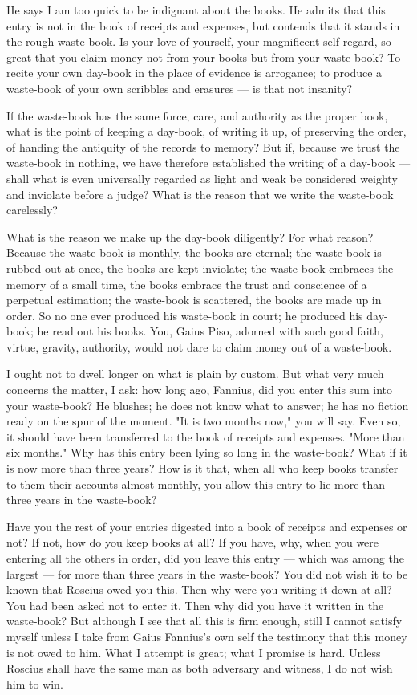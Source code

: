  He says I am too quick to be indignant about the books. He admits that this entry is not in the book of receipts and expenses, but contends that it stands in the rough waste-book. Is your love of yourself, your magnificent self-regard, so great that you claim money not from your books but from your waste-book? To recite your own day-book in the place of evidence is arrogance; to produce a waste-book of your own scribbles and erasures --- is that not insanity?

 If the waste-book has the same force, care, and authority as the proper book, what is the point of keeping a day-book, of writing it up, of preserving the order, of handing the antiquity of the records to memory? But if, because we trust the waste-book in nothing, we have therefore established the writing of a day-book --- shall what is even universally regarded as light and weak be considered weighty and inviolate before a judge? What is the reason that we write the waste-book carelessly?

 What is the reason we make up the day-book diligently? For what reason? Because the waste-book is monthly, the books are eternal; the waste-book is rubbed out at once, the books are kept inviolate; the waste-book embraces the memory of a small time, the books embrace the trust and conscience of a perpetual estimation; the waste-book is scattered, the books are made up in order. So no one ever produced his waste-book in court; he produced his day-book; he read out his books. You, Gaius Piso, adorned with such good faith, virtue, gravity, authority, would not dare to claim money out of a waste-book.

 I ought not to dwell longer on what is plain by custom. But what very much concerns the matter, I ask: how long ago, Fannius, did you enter this sum into your waste-book? He blushes; he does not know what to answer; he has no fiction ready on the spur of the moment. "It is two months now," you will say. Even so, it should have been transferred to the book of receipts and expenses. "More than six months." Why has this entry been lying so long in the waste-book? What if it is now more than three years? How is it that, when all who keep books transfer to them their accounts almost monthly, you allow this entry to lie more than three years in the waste-book?

 Have you the rest of your entries digested into a book of receipts and expenses or not? If not, how do you keep books at all? If you have, why, when you were entering all the others in order, did you leave this entry --- which was among the largest --- for more than three years in the waste-book? You did not wish it to be known that Roscius owed you this. Then why were you writing it down at all? You had been asked not to enter it. Then why did you have it written in the waste-book? But although I see that all this is firm enough, still I cannot satisfy myself unless I take from Gaius Fannius's own self the testimony that this money is not owed to him. What I attempt is great; what I promise is hard. Unless Roscius shall have the same man as both adversary and witness, I do not wish him to win.

